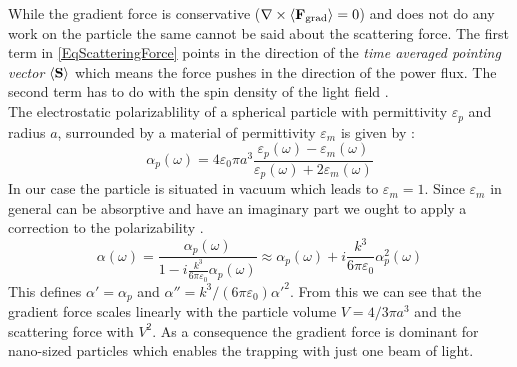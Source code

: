 While the gradient force is conservative ($\nabla\times\av{\field{F}{grad}}=0$) and does not do any work on the particle the same cannot be said about the scattering force. The first term in \autoref{EqScatteringForce} points in the direction of the \textit{time averaged pointing vector} $\av{\vc{S}}$ which means the force pushes in the direction of the power flux. The second term has to do with the spin density of the light field \cite[p.~457]{novotny2012principles}.\\
The electrostatic polarizablility of a spherical particle with permittivity $\varepsilon_{\si{p}}$ and radius $a$, surrounded by a material of permittivity $\varepsilon_{\si{m}}$ is given by \cite[p.~463]{novotny2012principles}:
\begin{equation}
	\alpha_{\si{p}}(\omega)=4\varepsilon_0\pi a^3\frac{\varepsilon_{\si{p}}(\omega)-\varepsilon_{\si{m}}(\omega)}{\varepsilon_{\si{p}}(\omega)+2\varepsilon_{\si{m}}(\omega)}
\end{equation}
In our case the particle is situated in vacuum which leads to $\varepsilon_{\si{m}}=1$. Since $\varepsilon_{\si{m}}$ in general can be absorptive and have an imaginary part we ought to apply a correction to the polarizability \cite[p.~19]{hebestreit2017thermal}.
\begin{equation}\label{EqPolarizability}
	\alpha(\omega)=\frac{\alpha_{\si{p}}(\omega)}{1-i\frac{k^3}{6\pi\varepsilon_0}\alpha_{\si{p}}(\omega)}\approx\alpha_{\si{p}}(\omega)+i\frac{k^3}{6\pi\varepsilon_0}\alpha_{\si{p}}^2(\omega)
\end{equation}
This defines $\alpha'=\alpha_{\si{p}}$ and $\alpha''=k^3/(6\pi\varepsilon_0)\alpha'^2$. From this we can see that the gradient force scales linearly with the particle volume $V=4/3\pi a^3$ and the scattering force with $V^2$. As a consequence the gradient force is dominant for nano-sized particles which enables the trapping with just one beam of light.


